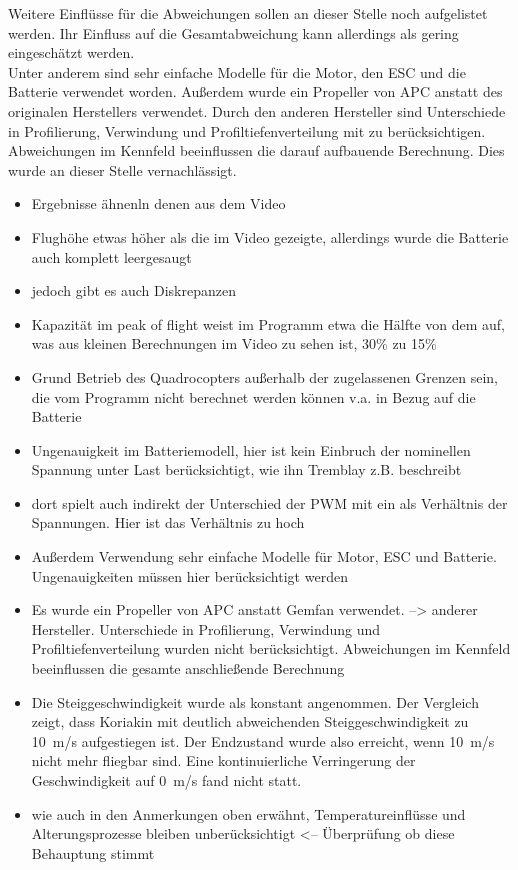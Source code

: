 Weitere Einflüsse für die Abweichungen sollen an dieser Stelle noch aufgelistet werden. Ihr Einfluss auf die Gesamtabweichung kann allerdings als gering eingeschätzt werden. \\
Unter anderem sind sehr einfache Modelle für die Motor, den ESC und die Batterie verwendet worden. Außerdem wurde ein Propeller von APC anstatt des originalen Herstellers verwendet. Durch den anderen Hersteller sind Unterschiede in Profilierung, Verwindung und Profiltiefenverteilung mit zu berücksichtigen. Abweichungen im Kennfeld beeinflussen die darauf aufbauende Berechnung. Dies wurde an dieser Stelle vernachlässigt.





\begin{itemize}
	\item Ergebnisse ähnenln denen aus dem Video
	\item Flughöhe etwas höher als die im Video gezeigte, allerdings wurde die Batterie auch komplett leergesaugt
	\item jedoch gibt es auch Diskrepanzen
	\item Kapazität im peak of flight weist im Programm etwa die Hälfte von dem auf, was aus kleinen Berechnungen im Video zu sehen ist, 30\% zu 15\%
	\item Grund Betrieb des Quadrocopters außerhalb der zugelassenen Grenzen sein, die vom Programm nicht berechnet werden können v.a. in Bezug auf die Batterie
	\item Ungenauigkeit im Batteriemodell, hier ist kein Einbruch der nominellen Spannung unter Last berücksichtigt, wie ihn Tremblay z.B. beschreibt
	\item dort spielt auch indirekt der Unterschied der PWM mit ein als Verhältnis der Spannungen. Hier ist das Verhältnis zu hoch
	\item Außerdem Verwendung sehr einfache Modelle für Motor, ESC und Batterie. Ungenauigkeiten müssen hier berücksichtigt werden
	\item Es wurde ein Propeller von APC anstatt Gemfan verwendet. --> anderer Hersteller. Unterschiede in Profilierung, Verwindung und Profiltiefenverteilung wurden nicht berücksichtigt. Abweichungen im Kennfeld beeinflussen die gesamte anschließende Berechnung
	\item Die Steiggeschwindigkeit wurde als konstant angenommen. Der Vergleich zeigt, dass Koriakin mit deutlich abweichenden Steiggeschwindigkeit zu \SI{10}{m/s} aufgestiegen ist. Der Endzustand wurde also erreicht, wenn \SI{10}{m/s} nicht mehr fliegbar sind. Eine kontinuierliche Verringerung der Geschwindigkeit auf \SI{0}{m/s} fand nicht statt. 
	\item wie auch in den Anmerkungen oben erwähnt, Temperatureinflüsse und Alterungsprozesse bleiben unberücksichtigt <-- Überprüfung ob diese Behauptung stimmt	
\end{itemize}